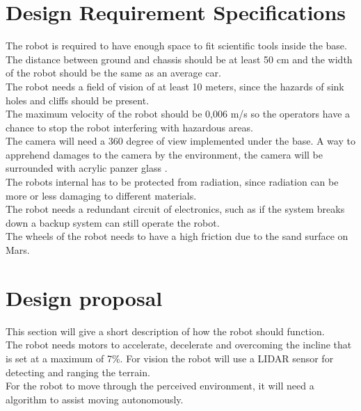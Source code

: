 \section{Design Requirement Specifications} \label{ch:Designrequiremnts}

The robot is required to have enough space to fit scientific tools inside the base.\\  
The distance between ground and chassis should be at least 50 cm and the width of the robot should be the same as an average car.\\ 
The robot needs a field of vision of at least 10 meters, since the hazards of sink holes and cliffs should be present.\\
The maximum velocity of the robot should be 0,006 m/s so the operators have a chance to stop the robot interfering with hazardous areas.\\
The camera will need a 360 degree of view implemented under the base. A way to apprehend damages to the camera by the environment, the camera will be surrounded with acrylic panzer glass \cite{Lidar360}.\\ 
The robots internal has to be protected from radiation, since radiation can be more or less damaging to different materials\cite{radiationEffectsInMaterials}.\\
The robot needs a redundant circuit of electronics, such as if the system breaks down a backup system can still operate the robot.\\
The wheels of the robot needs to have a high friction due to the sand surface on Mars\cite{sand}.

\section{Design proposal}\label{ch:Designproposal}
This section will give a short description of how the robot should function.\\
The robot needs motors to accelerate, decelerate and overcoming the incline that is set at a maximum of 7\%. For vision the robot will use a LIDAR sensor for detecting and ranging the terrain.\\
For the robot to move through the perceived environment, it will need a algorithm to assist moving autonomously.\\
